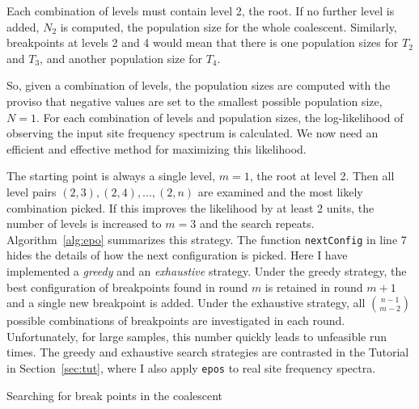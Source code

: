 \documentclass[a4paper, english]{article}
\newcommand{\ty}{\texttt}
\begin{document}
Each combination of levels must contain level 2, the root. If no
further level is added, $N_2$ is computed, the population size for the
whole coalescent. Similarly, breakpoints at levels 2 and 4 would mean
that there is one population sizes for $T_2$ and $T_3$, and another
population size for $T_4$.

So, given a combination of levels, the population sizes are computed
with the proviso that negative values are set to the smallest possible
population size, $N=1$. For each combination of levels and population
sizes, the log-likelihood of observing the input site frequency
spectrum is calculated. We now need an efficient and effective method
for maximizing this likelihood.

The starting point is always a single level, $m=1$, the root at level
2. Then all level pairs $(2,3), (2,4),...,(2,n)$ are examined and the
most likely combination picked. If this improves the likelihood by at
least 2 units, the number of levels is increased to $m=3$ and the
search repeats. Algorithm~\ref{alg:epo} summarizes this strategy. The
function \ty{nextConfig} in line 7 hides the details of how the next
configuration is picked. Here I have implemented a \emph{greedy} and
an \emph{exhaustive} strategy. Under the greedy strategy, the best
configuration of breakpoints found in round $m$ is retained in round
$m+1$ and a single new breakpoint is added. Under the exhaustive
strategy, all ${n-1\choose m-2}$ possible combinations of breakpoints
are investigated in each round. Unfortunately, for large samples, this
number quickly leads to unfeasible run times. The greedy and
exhaustive search strategies are contrasted in the Tutorial in
Section~\ref{sec:tut}, where I also apply \ty{epos} to real site
frequency spectra.

\begin{algorithm}
  \caption{Searching for break points in the coalescent}\label{alg:epo}
  
\end{algorithm}
\end{document}
